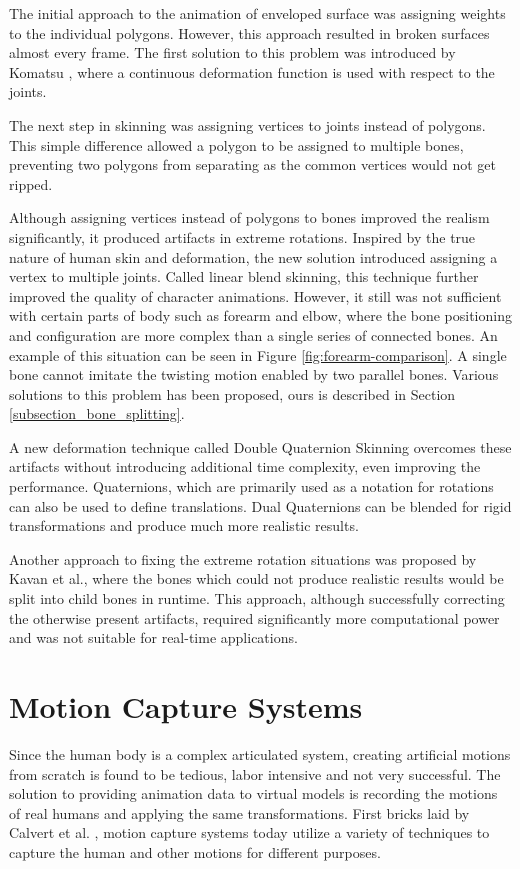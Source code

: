 The initial approach to the animation of enveloped surface was assigning weights to the individual polygons. However, this approach resulted in broken surfaces
almost every frame. The first solution to this problem was introduced by Komatsu \cite{Komatsu1988}, where a continuous deformation function is used with respect 
to the joints. 

The next step in skinning was assigning vertices to joints instead of polygons\cite{Lander1988}. This simple difference allowed a polygon to be assigned to multiple bones, 
preventing two polygons from separating as the common vertices would not get ripped.

Although assigning vertices instead of polygons to bones improved the realism significantly, it produced artifacts in extreme rotations. Inspired by the true 
nature of human skin and deformation, the new solution introduced assigning a vertex to multiple joints. Called linear blend skinning, this technique further 
improved the quality of character animations. However, it still was not sufficient with certain parts of body such as forearm and elbow, where the bone 
positioning and configuration are more complex than a single series of connected bones. An example of this situation can be seen in Figure \ref{fig:forearm-comparison}.
A single bone cannot imitate the twisting motion enabled by two parallel bones. Various solutions to this problem has been proposed, ours is described in 
Section \ref{subsection_bone_splitting}. 

A new deformation technique called Double Quaternion Skinning overcomes these artifacts without introducing additional time complexity\cite{Kavan2007}, even 
improving the performance. Quaternions, which are primarily used as a notation for rotations can also be used to define translations. Dual Quaternions can 
be blended for rigid transformations and produce much more realistic results.

Another approach to fixing the extreme rotation situations was proposed by Kavan et al.\cite{Kavan2009}, where the bones which could not produce realistic 
results would be split into child bones in runtime. This approach, although successfully correcting the otherwise present artifacts, required significantly more
computational power and was not suitable for real-time applications. 


\section{Motion Capture Systems}
\label{section_related_mocap}
 Since the human body is a complex articulated system, creating artificial motions from scratch is found to be tedious, labor intensive and not very successful.
 The solution to providing animation data to virtual models is recording the motions of real humans and applying the same transformations. First bricks laid by
 Calvert et al. \cite{Calvert1982}, motion capture systems today utilize a variety of techniques to capture the human and other motions for different purposes.
 
